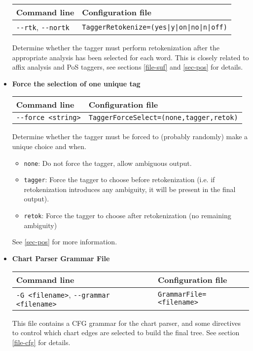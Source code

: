 \documentclass[a4paper]{book}
\begin{document}
\begin{itemize}
\begin{tabular}{|l|l|}
Command line       & Configuration file   \\ \hline
\verb#--rtk#, \verb#--nortk#    & \verb#TaggerRetokenize=(yes|y|on|no|n|off)#   \\ \hline
\end{tabular}

   Determine whether the tagger must perform retokenization after the
   appropriate analysis has been selected for each word.  This is
   closely related to affix analysis and PoS taggers, see sections
   \ref{file-suf} and \ref{sec-pos} for details.


\item {\bf Force the selection of one unique tag}

\begin{tabular}{|l|l|}
Command line       & Configuration file   \\ \hline
\verb#--force <string>#     & \verb#TaggerForceSelect=(none,tagger,retok)#    \\ \hline
\end{tabular}

   Determine whether the tagger must be forced to (probably randomly) make a unique choice and when.
   \begin{itemize}
    \item   {\tt none}: Do not force the tagger, allow ambiguous output.
    \item {\tt tagger}: Force the tagger to choose before
      retokenization (i.e. if retokenization introduces any ambiguity,
      it will be present in the final output).
    \item {\tt retok}: Force the tagger to choose after retokenization
      (no remaining ambiguity)
   \end{itemize}

 See \ref{sec-pos} for more information.

\item {\bf Chart Parser Grammar File}

\begin{tabular}{|l|l|}
Command line       & Configuration file   \\ \hline
\verb#-G <filename>#, \verb#--grammar <filename>#   & \verb#GrammarFile=<filename>#  \\ \hline
\end{tabular}

   This file contains a CFG grammar for the chart parser, and some
  directives to control which chart edges are selected to build the
  final tree.
   See section \ref{file-cfg} for details.



\end{itemize}
\end{document}
